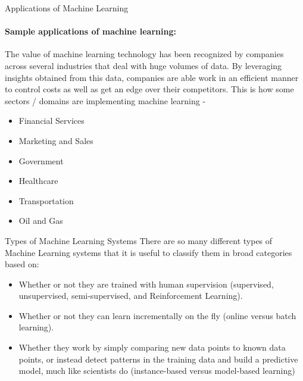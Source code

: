 \documentclass{beamer}
\begin{document}
\begin{frame}{Applications of Machine Learning}
  \framesubtitle{Sample applications of machine learning:}
  The value of machine learning technology has been recognized by companies across several industries that deal with huge volumes of data. By leveraging insights obtained from this data, companies are able work in an efficient manner to control costs as well as get an edge over their competitors. This is how some sectors / domains are implementing machine learning -
  \begin{itemize}
      \item Financial Services
      \item Marketing and Sales
      \item Government
      \item Healthcare
      \item Transportation
      \item Oil and Gas
  \end{itemize}
\end{frame}
\begin{frame}{Types of Machine Learning Systems}
There are so many different types of Machine Learning systems that it is useful to classify them in broad categories based on:\\
\vspace{10pt}
\begin{itemize}
    \item Whether or not they are trained with human supervision (supervised, unsupervised, semi-supervised, and Reinforcement Learning).
    \vspace{10pt}
    \item Whether or not they can learn incrementally on the fly (online versus batch learning).
    \vspace{10pt}
    \item Whether they work by simply comparing new data points to known data points, or instead detect patterns in the training data and build a predictive model, much like scientists do (instance-based versus model-based learning)
\end{itemize}
\end{frame}
\end{document}
